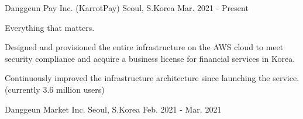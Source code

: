 

\begin{cventries}

	{Danggeun Pay Inc. (KarrotPay)} %
	{Seoul, S.Korea} %
	{Mar. 2021 - Present} %
	{
		\begin{cvitems} %
			\item {Everything that matters.}
			\item {Designed and provisioned the entire infrastructure on the AWS cloud to meet security compliance and acquire a business license for financial services in Korea.}
			\item {Continuously improved the infrastructure architecture since launching the service. (currently 3.6 million users)}
		\end{cvitems}
	}

	{Danggeun Market Inc.} %
	{Seoul, S.Korea} %
	{Feb. 2021 - Mar. 2021} %
	{}


\end{cventries}
